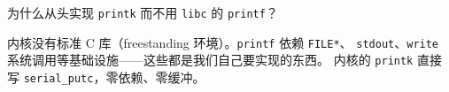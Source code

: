 \begin{designbox}
为什么从头实现 \texttt{printk} 而不用 \texttt{libc} 的 \texttt{printf}？

内核没有标准 C 库（freestanding 环境）。\texttt{printf} 依赖 \texttt{FILE*}、
\texttt{stdout}、\texttt{write} 系统调用等基础设施——这些都是我们自己要实现的东西。
内核的 \texttt{printk} 直接写 \texttt{serial\_putc}，零依赖、零缓冲。
\end{designbox}


